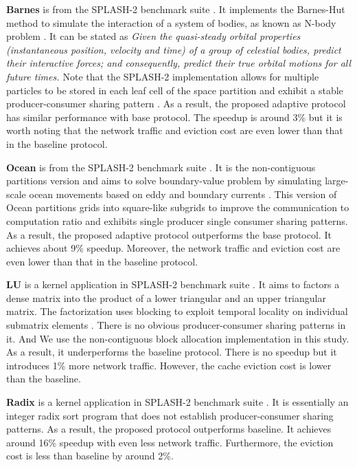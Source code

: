 \documentclass[11pt,conference]{IEEEtran}
\begin{document}
\textbf{Barnes} is from the SPLASH-2 benchmark suite \cite{splash}. It implements the Barnes-Hut method to simulate the interaction of a system of bodies, as known as N-body problem \cite{nbody}. It can be stated as \textit{Given the quasi-steady orbital properties (instantaneous position, velocity and time) of a group of celestial bodies, predict their interactive forces; and consequently, predict their true orbital motions for all future times. \cite{nbody_wiki}} Note that the SPLASH-2 implementation allows for multiple particles to be stored in each leaf cell of the space partition and exhibit a stable producer-consumer sharing pattern \cite{barnes}. As a result, the proposed adaptive protocol has similar performance with base protocol. The speedup is around 3\% but it is worth noting that the network traffic and eviction cost are even lower than that in the baseline protocol.

\textbf{Ocean} is from the SPLASH-2 benchmark suite \cite{splash}. It is the non-contiguous partitions version and aims to solve boundary-value problem by simulating large-scale ocean movements based on eddy and boundary currents \cite{ocean}. This version of Ocean partitions grids into square-like subgrids to improve the communication to computation ratio and exhibits single producer single consumer sharing patterns. As a result, the proposed adaptive protocol outperforms the base protocol. It achieves about 9\% speedup. Moreover, the network traffic and eviction cost are even lower than that in the baseline protocol.

\textbf{LU} is a kernel application in SPLASH-2 benchmark suite \cite{splash}. It aims to factors a dense matrix into the product of a lower triangular and an upper triangular matrix.  The factorization uses blocking to exploit temporal locality on individual submatrix elements \cite{lu}. There is no obvious producer-consumer sharing patterns in it. And We use the non-contiguous block allocation implementation in this study. As a result, it underperforms the baseline protocol. There is no speedup but it introduces 1\% more network traffic. However, the cache eviction cost is lower than the baseline.

\textbf{Radix} is a kernel application in SPLASH-2 benchmark suite \cite{splash}. It is essentially an integer radix sort program that does not establish producer-consumer sharing patterns. As a result, the proposed protocol outperforms baseline. It achieves around 16\% speedup with even less network traffic. Furthermore, the eviction cost is less than baseline by around 2\%.
\end{document}
